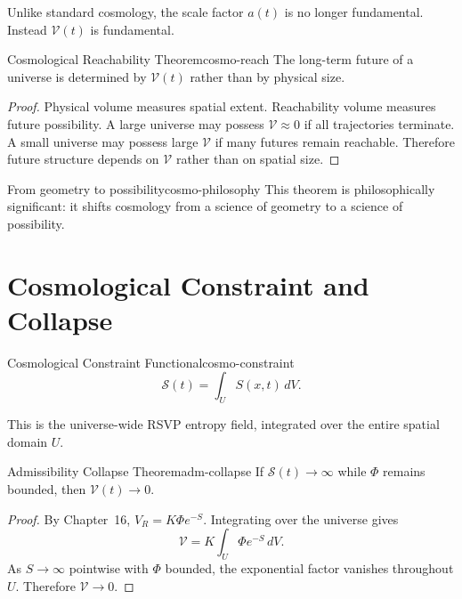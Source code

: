 \documentclass[12pt,twoside,openright]{book}
\begin{document}
Unlike standard cosmology, the scale factor $a(t)$ is no
longer fundamental. Instead $\mathcal{V}(t)$ is fundamental.

\begin{theorem}{Cosmological Reachability Theorem}{cosmo-reach}
  The long-term future of a universe is determined by
  $\mathcal{V}(t)$ rather than by physical size.
\end{theorem}

\begin{proof}
  Physical volume measures spatial extent. Reachability
  volume measures future possibility. A large universe may
  possess $\mathcal{V} \approx 0$ if all trajectories
  terminate. A small universe may possess large
  $\mathcal{V}$ if many futures remain reachable. Therefore
  future structure depends on $\mathcal{V}$ rather than on
  spatial size.
\end{proof}

\begin{remark}{From geometry to possibility}{cosmo-philosophy}
  This theorem is philosophically significant: it shifts
  cosmology from a science of geometry to a science of
  possibility.
\end{remark}

\section{Cosmological Constraint and Collapse}
\label{sec:ch18-collapse}

\begin{definition}{Cosmological Constraint Functional}{cosmo-constraint}
  \[
    \mathcal{S}(t) = \int_U S(x,t)\, dV.
  \]
\end{definition}

This is the universe-wide RSVP entropy field, integrated
over the entire spatial domain $U$.

\begin{theorem}{Admissibility Collapse Theorem}{adm-collapse}
  If $\mathcal{S}(t) \to \infty$ while $\Phi$ remains
  bounded, then $\mathcal{V}(t) \to
  0$.
\end{theorem}

\begin{proof}
  By Chapter~16, $V_R = K\Phi e^{-S}$. Integrating over the
  universe gives
  \[
    \mathcal{V} = K \int_U \Phi e^{-S} \, dV.
  \]
  As $S \to \infty$ pointwise with $\Phi$ bounded, the
  exponential factor vanishes throughout $U$. Therefore
  $\mathcal{V} \to 0$.
\end{proof}
\end{document}
